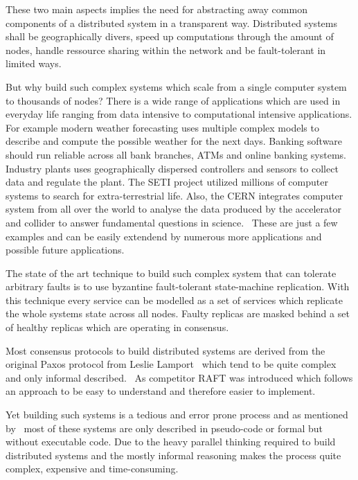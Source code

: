 These two main aspects implies the need for abstracting away common components
of a distributed system in a transparent way. Distributed systems shall be
geographically divers, speed up computations through the amount of nodes,
handle ressource sharing within the network and be fault-tolerant in limited
ways.

But why build such complex systems which scale from a single computer system
to thousands of nodes? There is a wide range of applications which are used in
everyday life ranging from data intensive to computational intensive
applications. For example modern weather forecasting uses multiple complex
models to describe and compute the possible weather for the next days.
Banking software should run reliable across all bank branches, ATMs and
online banking systems. Industry plants uses geographically dispersed
controllers and sensors to collect data and regulate the plant.
The SETI project utilized millions of computer systems to search for
extra-terrestrial life. Also, the CERN integrates computer system from
all over the world to analyse the data produced by the accelerator and
collider to answer fundamental questions in science.~\cite{ghosh2014distributed}
These are just a few examples and can be easily extendend by numerous
more applications and possible future applications.

The state of the art technique to build such complex system that can
tolerate arbitrary faults is to use byzantine fault-tolerant state-machine
replication. With this technique every service can be modelled as a
set of services which replicate the whole systems state across all
nodes. Faulty replicas are masked behind a set of healthy replicas
which are operating in consensus.~\cite{rahli2018velisarios}

Most consensus protocols to build distributed systems are derived from
the original Paxos protocol from Leslie Lamport~\cite{lamport2001paxos}
which tend to be quite complex and only informal
described.~\cite{ongaro2014search}
As competitor RAFT was introduced which follows an approach to be
easy to understand and therefore easier to implement.

Yet building such systems is a tedious and error prone process and
as mentioned by~\cite{dragoi2015need} most of these systems are only
described in pseudo-code or formal but without executable code.
Due to the heavy parallel thinking required to build distributed
systems and the mostly informal reasoning makes the process quite
complex, expensive and time-consuming.

